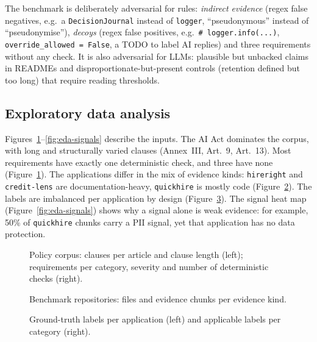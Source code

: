 The benchmark is deliberately adversarial for rules: \emph{indirect evidence} (regex false negatives, e.g.\ a
\texttt{DecisionJournal} instead of \texttt{logger}, ``pseudonymous'' instead of ``pseudonymise''), \emph{decoys} (regex
false positives, e.g.\ \texttt{\# logger.info(...)}, \texttt{override\_allowed = False}, a TODO to label AI replies) and
three requirements without any check. It is also adversarial for LLMs: plausible but unbacked claims in READMEs and
disproportionate-but-present controls (retention defined but too long) that require reading thresholds.

\subsection{Exploratory data analysis}
\label{section:eda}

Figures~\ref{fig:eda-corpus}--\ref{fig:eda-signals} describe the inputs. The AI Act dominates the corpus, with long and
structurally varied clauses (Annex~III, Art.~9, Art.~13). Most requirements have exactly one deterministic check, and three
have none (Figure~\ref{fig:eda-corpus}). The applications differ in the mix of evidence kinds: \texttt{hireright} and
\texttt{credit-lens} are documentation-heavy, \texttt{quickhire} is mostly code (Figure~\ref{fig:eda-bench}). The labels
are imbalanced per application by design (Figure~\ref{fig:eda-labels}). The signal heat map
(Figure~\ref{fig:eda-signals}) shows why a signal alone is weak evidence: for example, 50\% of \texttt{quickhire} chunks
carry a PII signal, yet that application has no data protection.

\begin{figure}[htbp]
\centering
{}\hfill
{}
\caption{Policy corpus: clauses per article and clause length (left); requirements per category, severity and number of
deterministic checks (right).}
\label{fig:eda-corpus}
\end{figure}

\begin{figure}[htbp]
\centering
{}
\caption{Benchmark repositories: files and evidence chunks per evidence kind.}
\label{fig:eda-bench}
\end{figure}

\begin{figure}[htbp]
\centering
{}
\caption{Ground-truth labels per application (left) and applicable labels per category (right).}
\label{fig:eda-labels}
\end{figure}


